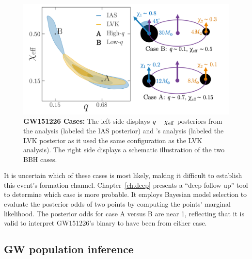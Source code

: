 \begin{figure}
\begin{center}
  \centerline{\includegraphics[width=1.1\linewidth]{src/figures/gw151226_cases.png}}
  \caption{\textbf{GW151226 Cases:} The left side displays $q-\chi_{\rm eff}$ posteriors from the \citet{Chia:2022:PhRvD} analysis (labeled the IAS posterior) and \citet{Mateu-Lucena:2021:arXiv}'s analysis (labeled the LVK posterior as it used the same configuration as the LVK analysis). The right side displays a schematic illustration of the two BBH cases. 
  }
  \label{fig:gw151226_cases}
\end{center}
\end{figure}


It is uncertain which of these cases is most likely, making it difficult to establish this event's formation channel.
Chapter~\ref{ch.deep} presents a ``deep follow-up'' tool to determine which case is  more probable.
It employs Bayesian model selection to evaluate the posterior odds of two points by computing the points' marginal likelihood.
The posterior odds for case A versus B are near 1, reflecting that it is valid to interpret GW151226's binary to have been from either case.

\subsection{GW population inference}


